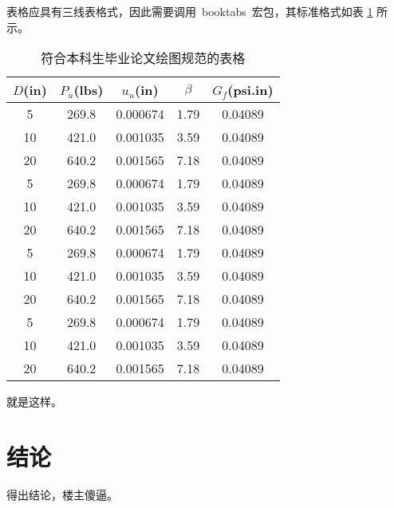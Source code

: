 表格应具有三线表格式，因此需要调用~booktabs~宏包，其标准格式如表 \ref{tab:table1} 所示。
\begin{table}[htbp]
\caption{符合本科生毕业论文绘图规范的表格}\label{tab:table1}
\vspace{0.5em}\centering\wuhao
\begin{tabular}{ccccc}
\toprule[1.5pt]
$D$(in) & $P_u$(lbs) & $u_u$(in) & $\beta$ & $G_f$(psi.in)\\
\midrule[1pt]
 5 & 269.8 & 0.000674 & 1.79 & 0.04089\\
10 & 421.0 & 0.001035 & 3.59 & 0.04089\\
20 & 640.2 & 0.001565 & 7.18 & 0.04089\\
 5 & 269.8 & 0.000674 & 1.79 & 0.04089\\
10 & 421.0 & 0.001035 & 3.59 & 0.04089\\
20 & 640.2 & 0.001565 & 7.18 & 0.04089\\
 5 & 269.8 & 0.000674 & 1.79 & 0.04089\\
10 & 421.0 & 0.001035 & 3.59 & 0.04089\\
20 & 640.2 & 0.001565 & 7.18 & 0.04089\\
 5 & 269.8 & 0.000674 & 1.79 & 0.04089\\
10 & 421.0 & 0.001035 & 3.59 & 0.04089\\
20 & 640.2 & 0.001565 & 7.18 & 0.04089\\
\bottomrule[1.5pt]
\end{tabular}
\vspace{\baselineskip}
\end{table}

就是这样。



\chapter*{结\quad 论}

得出结论，楼主傻逼。